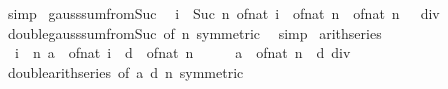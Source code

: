 \begin{isabellebody}
\ simp%
\endisatagproof
{\isafoldproof}%
%
\isadelimproof
\isanewline
%
\endisadelimproof
\isanewline
{}\isamarkupfalse%
\ gauss{\isacharunderscore}{\kern0pt}sum{\isacharunderscore}{\kern0pt}from{\isacharunderscore}{\kern0pt}Suc{\isacharunderscore}{\kern0pt}{}{\isacharcolon}{\kern0pt}\isanewline
\ \ {\isachardoublequoteopen}{\isacharparenleft}{\kern0pt}{\isasymSum}i\ {\isacharequal}{\kern0pt}\ Suc\ {}{\isachardot}{\kern0pt}{\isachardot}{\kern0pt}n{\isachardot}{\kern0pt}\ of{\isacharunderscore}{\kern0pt}nat\ i{\isacharparenright}{\kern0pt}\ {\isacharequal}{\kern0pt}\ of{\isacharunderscore}{\kern0pt}nat\ n\ {\isacharasterisk}{\kern0pt}\ {\isacharparenleft}{\kern0pt}of{\isacharunderscore}{\kern0pt}nat\ n\ {\isacharplus}{\kern0pt}\ {}{\isacharparenright}{\kern0pt}\ div\ {}{\isachardoublequoteclose}\isanewline
%
\isadelimproof
\ \ %
\endisadelimproof
%
\isatagproof
{}\isamarkupfalse%
\ double{\isacharunderscore}{\kern0pt}gauss{\isacharunderscore}{\kern0pt}sum{\isacharunderscore}{\kern0pt}from{\isacharunderscore}{\kern0pt}Suc{\isacharunderscore}{\kern0pt}{}\ {\isacharbrackleft}{\kern0pt}of\ n{\isacharcomma}{\kern0pt}\ symmetric{\isacharbrackright}{\kern0pt}\ \isamarkupfalse%
\ simp%
\endisatagproof
{\isafoldproof}%
%
\isadelimproof
\isanewline
%
\endisadelimproof
\isanewline
{}\isamarkupfalse%
\ arith{\isacharunderscore}{\kern0pt}series{\isacharcolon}{\kern0pt}\isanewline
\ \ {\isachardoublequoteopen}{\isacharparenleft}{\kern0pt}{\isasymSum}i\ {\isacharequal}{\kern0pt}\ {}{\isachardot}{\kern0pt}{\isachardot}{\kern0pt}n{\isachardot}{\kern0pt}\ a\ {\isacharplus}{\kern0pt}\ of{\isacharunderscore}{\kern0pt}nat\ i\ {\isacharasterisk}{\kern0pt}\ d{\isacharparenright}{\kern0pt}\ {\isacharequal}{\kern0pt}\ {\isacharparenleft}{\kern0pt}of{\isacharunderscore}{\kern0pt}nat\ n\ {\isacharplus}{\kern0pt}\ {}{\isacharparenright}{\kern0pt}\ {\isacharasterisk}{\kern0pt}\ {\isacharparenleft}{\kern0pt}{}\ {\isacharasterisk}{\kern0pt}\ a\ {\isacharplus}{\kern0pt}\ of{\isacharunderscore}{\kern0pt}nat\ n\ {\isacharasterisk}{\kern0pt}\ d{\isacharparenright}{\kern0pt}\ div\ {}{\isachardoublequoteclose}\isanewline
%
\isadelimproof
\ \ %
\endisadelimproof
%
\isatagproof
{}\isamarkupfalse%
\ double{\isacharunderscore}{\kern0pt}arith{\isacharunderscore}{\kern0pt}series\ {\isacharbrackleft}{\kern0pt}of\ a\ d\ n{\isacharcomma}{\kern0pt}\ symmetric{\isacharbrackright}{\kern0pt}\ \isamarkupfalse%

\end{isabellebody}
